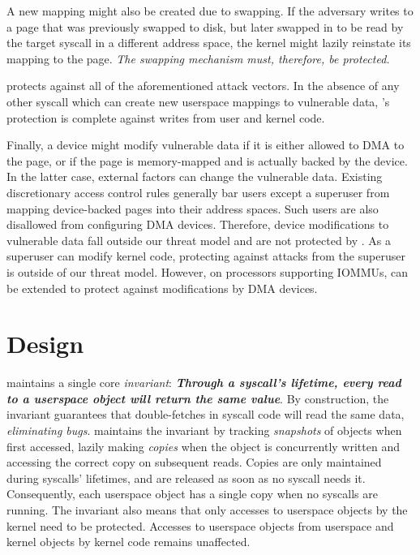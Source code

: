 \documentclass[letterpaper,twocolumn,10pt, anonymous]{article}
\begin{document}
A new mapping might also be created due to swapping.
If the adversary writes to a page that was previously swapped 
to disk, but later swapped in to be read by the target syscall in 
a different address space, the kernel might lazily reinstate its 
mapping to the page.
\emph{The swapping mechanism must, therefore, be protected.}

\tiktok protects against all of the aforementioned attack vectors.
In the absence of any other syscall which can create new userspace 
mappings to vulnerable data, \tiktok's protection is complete 
against writes from user and kernel code.

Finally, a device might modify vulnerable data if it is either 
allowed to DMA to the page, or if the page is memory-mapped and is 
actually backed by the device.
In the latter case, external factors can change the vulnerable 
data.
Existing discretionary access control rules generally bar users 
except a superuser from mapping device-backed pages into their
address spaces.
Such users are also disallowed from configuring DMA devices.
Therefore, device modifications to vulnerable data fall outside 
our threat model and are not protected by \tiktok.
As a superuser can modify kernel code, protecting against attacks from the
superuser is outside of our threat model.
However, on processors supporting IOMMUs, \tiktok can be extended 
to protect against modifications by DMA devices.


\section{\tiktok Design} 
\label{sec:design}

\tiktok maintains a single core \emph{invariant}:
\textbf{\emph{Through a syscall's lifetime, every read to a userspace object 
will return the same value}}.
By construction, the invariant guarantees that double-fetches in syscall
code will read the same data, \emph{eliminating \tocttou bugs}.
\tiktok maintains the invariant by tracking \emph{snapshots} of objects
when first accessed, lazily making \emph{copies} when the object is concurrently 
written and accessing the correct copy on subsequent reads.
Copies are only maintained during syscalls' lifetimes, and are released as 
soon as no syscall needs it.
Consequently, each userspace object has a single copy when no syscalls are
running.
The invariant also means that only accesses to userspace objects by the kernel
need to be protected. 
Accesses to userspace objects from userspace and kernel objects by kernel 
code remains unaffected.
\end{document}
